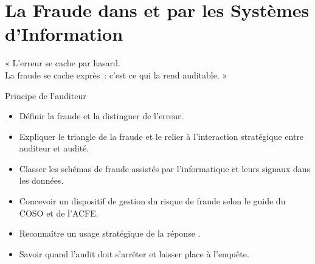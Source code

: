 
\chapter{La Fraude dans et par les Systèmes d'Information}
\label{chap:fraude}

\epigraph{%
    « L'erreur se cache par hasard.\\
    La fraude se cache exprès~: c'est ce qui la rend auditable. »%
}{Principe de l'auditeur}


\begin{boxobjectifs}
\begin{itemize}
    \item Définir la fraude et la distinguer de l'erreur.
    \item Expliquer le triangle de la fraude et le relier à l'interaction
          stratégique entre auditeur et audité.
    \item Classer les schémas de fraude assistés par l'informatique et leurs
          signaux dans les données.
    \item Concevoir un dispositif de gestion du risque de fraude selon le
          guide du COSO et de l'ACFE.
    \item Reconnaître un usage stratégique de la réponse \NEK{}.
    \item Savoir quand l'audit doit s'arrêter et laisser place à
          l'enquête.
\end{itemize}
\end{boxobjectifs}

